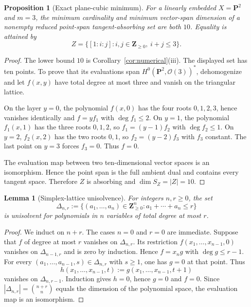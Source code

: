 \documentclass[11pt]{article}
\newtheorem{proposition}[theorem]{Proposition}
\newtheorem{lemma}[theorem]{Lemma}
\newcommand{\PP}{\mathbf P}
\newcommand{\cO}{\mathcal O}
\begin{document}
\begin{proposition}[Exact plane-cubic minimum]\label{prop:p2-sharpness}
For a linearly embedded $X=\PP^2$ and $m=3$, the minimum cardinality and
minimum vector-span dimension of a nonempty reduced point-span
tangent-absorbing set are both $10$.  Equality is attained by
\[
 Z=\{[1:i:j]:i,j\in\mathbf Z_{\geq0},\ i+j\leq3\}.
\]
\end{proposition}

\begin{proof}
The lower bound $10$ is Corollary~\ref{cor:numerical}(iii).  The displayed
set has ten points.  To prove that its evaluations span
$H^0(\PP^2,\cO(3))^*$, dehomogenize and let $f(x,y)$ have total degree at
most three and vanish on the triangular lattice.

On the layer $y=0$, the polynomial $f(x,0)$ has the four roots
$0,1,2,3$, hence vanishes identically and $f=yf_1$ with
$\deg f_1\leq2$.  On $y=1$, the polynomial $f_1(x,1)$ has the three roots
$0,1,2$, so $f_1=(y-1)f_2$ with $\deg f_2\leq1$.  On $y=2$,
$f_2(x,2)$ has the two roots $0,1$, so $f_2=(y-2)f_3$ with $f_3$ constant.
The last point on $y=3$ forces $f_3=0$.  Thus $f=0$.

The evaluation map between two ten-dimensional vector spaces is an
isomorphism.  Hence the point span is the full ambient dual and contains
every tangent space.  Therefore $Z$ is absorbing and
$\dim S_Z=|Z|=10$.
\end{proof}

\begin{lemma}[Simplex-lattice unisolvence]\label{lem:simplex-unisolvence}
For integers $n,r\geq0$, the set
\[
 \Delta_{n,r}:=\{(a_1,\ldots,a_n)\in\mathbf Z_{\geq0}^n:
                         a_1+\cdots+a_n\leq r\}
\]
is unisolvent for polynomials in $n$ variables of total degree at most $r$.
\end{lemma}

\begin{proof}
We induct on $n+r$.  The cases $n=0$ and $r=0$ are immediate.  Suppose that
$f$ of degree at most $r$ vanishes on $\Delta_{n,r}$.  Its restriction
$f(x_1,\ldots,x_{n-1},0)$ vanishes on $\Delta_{n-1,r}$ and is zero by
induction.  Hence $f=x_n g$ with $\deg g\leq r-1$.  For every
$(a_1,\ldots,a_{n-1},s)\in\Delta_{n,r}$ with $s\geq1$, one has $g=0$ at
that point.  Thus
\[
 h(x_1,\ldots,x_{n-1},t)
 :=g(x_1,\ldots,x_{n-1},t+1)
\]
vanishes on $\Delta_{n,r-1}$.  Induction gives $h=0$, hence $g=0$ and
$f=0$.  Since $|\Delta_{n,r}|=\binom{n+r}{n}$ equals the dimension of the
polynomial space, the evaluation map is an isomorphism.
\end{proof}
\end{document}
